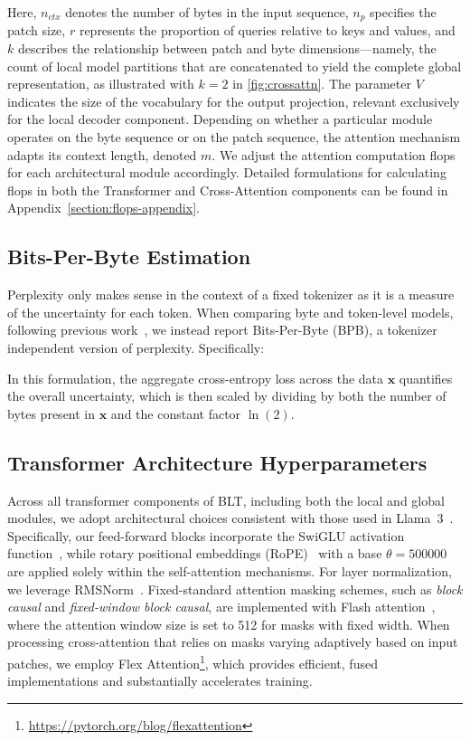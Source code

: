 Here, $n_{ctx}$ denotes the number of bytes in the input sequence, $n_p$ specifies the patch size, $r$ represents the proportion of queries relative to keys and values, and $k$ describes the relationship between patch and byte dimensions—namely, the count of local model partitions that are concatenated to yield the complete global representation, as illustrated with $k=2$ in \autoref{fig:crossattn}. The parameter $V$ indicates the size of the vocabulary for the output projection, relevant exclusively for the local decoder component. Depending on whether a particular module operates on the byte sequence or on the patch sequence, the attention mechanism adapts its context length, denoted $m$. We adjust the attention computation flops for each architectural module accordingly. Detailed formulations for calculating flops in both the Transformer and Cross-Attention components can be found in Appendix~\ref{section:flops-appendix}.

\subsection{Bits-Per-Byte Estimation} Perplexity only makes sense in the context of a fixed tokenizer as it is a measure of the uncertainty for each token. When comparing byte and token-level models, following previous work~\citep{xue2022byt5, yu2023megabyte, wang2024mambabyte}, we instead report Bits-Per-Byte (BPB), a tokenizer independent version of perplexity. Specifically:

In this formulation, the aggregate cross-entropy loss across the data $\pmb{x}$ quantifies the overall uncertainty, which is then scaled by dividing by both the number of bytes present in $\pmb{x}$ and the constant factor $\ln(2)$.

\subsection{Transformer Architecture Hyperparameters} Across all transformer components of {\textsc BLT}, including both the local and global modules, we adopt architectural choices consistent with those used in Llama~3~\citep{dubey2024llama}. Specifically, our feed-forward blocks incorporate the SwiGLU activation function~\citep{swiglu}, while rotary positional embeddings (RoPE)~\citep{RoPe} with a base $\theta=500000$~\citep{xiong2024effective} are applied solely within the self-attention mechanisms. For layer normalization, we leverage RMSNorm~\citep{RMSNorm}. Fixed-standard attention masking schemes, such as \textit{block causal} and \textit{fixed-window block causal}, are implemented with Flash attention~\citep{dao2022flashattention}, where the attention window size is set to 512 for masks with fixed width. When processing cross-attention that relies on masks varying adaptively based on input patches, we employ Flex Attention\footnote{\url{https://pytorch.org/blog/flexattention}}, which provides efficient, fused implementations and substantially accelerates training.

